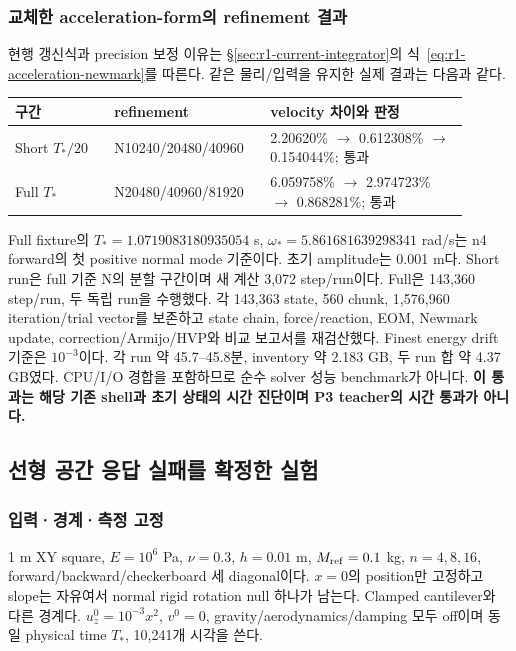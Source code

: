 \documentclass[10pt]{article}
\begin{document}
\subsubsection{교체한 acceleration-form의 refinement 결과}

현행 갱신식과 precision 보정 이유는 \S\ref{sec:r1-current-integrator}의
식~\eqref{eq:r1-acceleration-newmark}를 따른다. 같은 물리/입력을 유지한 실제 결과는 다음과 같다.

\begin{longtable}{L{0.20\linewidth}L{0.30\linewidth}L{0.40\linewidth}}
\toprule 구간 & refinement & velocity 차이와 판정\\\midrule
Short \(T_*/20\) & N10240/20480/40960 & 2.20620\% $\to$ 0.612308\% $\to$ 0.154044\%; 통과\\
Full \(T_*\) & N20480/40960/81920 & 6.059758\% $\to$ 2.974723\% $\to$ 0.868281\%; 통과\\
\bottomrule\end{longtable}

Full fixture의 \(T_*=1.0719083180935054\) s,
\(\omega_*=5.861681639298341\) rad/s는 n4 forward의 첫 positive normal mode 기준이다.
초기 amplitude는 0.001 m다. Short run은 full 기준 N의 분할 구간이며 새 계산 3,072 step/run이다.
Full은 143,360 step/run, 두 독립 run을 수행했다. 각 143,363 state, 560 chunk,
1,576,960 iteration/trial vector를 보존하고 state chain, force/reaction, EOM, Newmark update,
correction/Armijo/HVP와 비교 보고서를 재검산했다. Finest energy drift 기준은 \(10^{-3}\)이다.
각 run 약 45.7--45.8분, inventory 약 2.183 GB, 두 run 합 약 4.37 GB였다.
CPU/I/O 경합을 포함하므로 순수 solver 성능 benchmark가 아니다.
\textbf{이 통과는 해당 기존 shell과 초기 상태의 시간 진단이며 P3 teacher의 시간 통과가 아니다.}

\subsection{선형 공간 응답 실패를 확정한 실험}

\subsubsection{입력·경계·측정 고정}

1 m XY square, \(E=10^6\) Pa, \(\nu=0.3\), \(h=0.01\) m,
\(M_{\rm ref}=0.1\) kg, \(n=4,8,16\), forward/backward/checkerboard 세 diagonal이다.
\(x=0\)의 position만 고정하고 slope는 자유여서 normal rigid rotation null 하나가 남는다.
Clamped cantilever와 다른 경계다. \(u_z^0=10^{-3}x^2\), \(v^0=0\),
gravity/aerodynamics/damping 모두 off이며 동일 physical time \(T_*\), 10,241개 시각을 쓴다.
\end{document}
